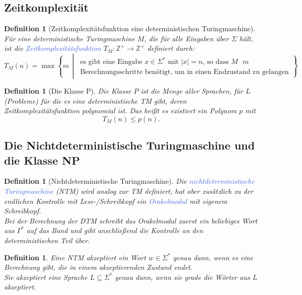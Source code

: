 \documentclass[11pt]{scrartcl}
\newcommand{\tcol}[1]{\textcolor{RoyalBlue}{#1}}
\newcommand{\set}[1]{\left\lbrace #1\right\rbrace}
\theoremstyle{break}
\newtheorem{defi}[satz]{Definition}
\begin{document}
    \subsection{Zeitkomplexität}
	\label{subsec:zeitkomplexität}

    \begin{defi}[Zeitkomplexitätsfunktion eine deterministischen Turingmaschine]
        Für eine deterministische Turingmaschine $M$, die für alle Eingaben über $\Sigma$ hält, ist die \tcol{Zeitkomplexitätsfunktion} $T_M\colon\mathbb{Z}^+\to\mathbb{Z}^+$ definiert durch:
        \[
            T_M(n)=\max\set{m\,\middle|\,
            \begin{array}{c}
                \text{es gibt eine Eingabe $x\in\Sigma^*$ mit $|x|=n$, so dass $M$ $m$}\\
                \text{Berechnungsschritte benötigt, um in einen Endzustand zu gelangen}
            \end{array}}
        \]
    \end{defi}

    \begin{defi}[Die Klasse P]
        Die Klasse $P$ ist die Menge aller Sprachen, für $L$ (Probleme) für die es eine deterministische TM gibt, deren Zeitkomplexitätsfunktion polynomial ist.
        Das heißt es existiert ein Polynom $p$ mit\[T_M(n)\leq p(n).\]
    \end{defi}


    \subsection{Die Nichtdeterministische Turingmaschine und die Klasse NP}
	\label{subsec:die-nichtdeterministische-turingmaschine-und-die-klasse-np}

    \begin{defi}[Nichtdeterministische Turingmaschine]
        Die \tcol{nichtdeterministische Turingmaschine} (NTM) wird analog zur TM definiert, hat aber zusätzlich zu der endlichen Kontrolle mit Lese-/Schreibkopf ein \tcol{Orakelmodul} mit eigenem Schreibkopf.\\
        Bei der Berechnung der DTM schreibt das Orakelmodul zuerst ein beliebiges Wort aus $\Gamma^*$ auf das Band und gibt anschließend die Kontrolle an den deterministischen Teil über.
    \end{defi}

    \begin{defi}
        Eine NTM akzeptiert ein Wort $w\in\Sigma^*$ genau dann, wenn es eine Berechnung gibt, die in einem akzeptierenden Zustand endet.\\
        Sie akzeptiert eine Sprache $L\subseteq\Sigma^*$ genau dann, wenn sie grade die Wörter aus $L$ akzeptiert.
    \end{defi}
\end{document}
